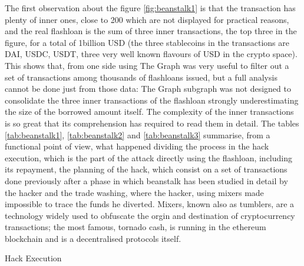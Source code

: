 \documentclass[11pt,a4paper,titlepage]{scrartcl}
\begin{document}
 The first observation about the figure \ref{fig:beanstalk1}  is that the transaction has plenty of inner ones, close to 200 which are not displayed for practical reasons, and the real flashloan is the sum of three inner transactions, the top three in the figure,  for a total of 1billion USD (the three stablecoins in the transactions are DAI, USDC, USDT, three very well known flavours of USD in the crypto space). This shows that, from one side using The Graph was very useful to filter out a set of transactions among thousands of flashloans issued, but a full analysis cannot be done just from those data: The Graph subgraph was not designed to consolidate the three inner transactions of the flashloan strongly underestimating the size of the borrowed amount itself. The complexity of the inner transactions is so great that its comprehension has required  to read them in detail.  The tables \ref{tab:beanstalk1}, \ref{tab:beanstalk2} and \ref{tab:beanstalk3} summarise, from a functional point of view, what happened dividing the process in the hack execution, which is the part of the attack directly using the flashloan, including its repayment, the planning of the hack, which consist on a set of transactions done previously after a phase in which beanstalk has been studied in detail by the hacker and  the trade washing, where the hacker, using mixers made impossible to trace the funds he diverted. Mixers, known also as tumblers, are a technology widely used  to obfuscate the orgin and destination of cryptocurrency transactions;  the most famous, tornado cash, is running in the ethereum blockchain and is a decentralised protocols itself.
 
 
 
\begin{table}[H]
\centering
\caption{Hack Execution}
\captionsetup{font=footnotesize, justification=centering}
\caption*{\footnotesize This table summarises the execution phase of the Beanstalk exploit, including the flashloan and proposal execution.}
\label{tab:beanstalk1}
\end{table}
\end{document}
